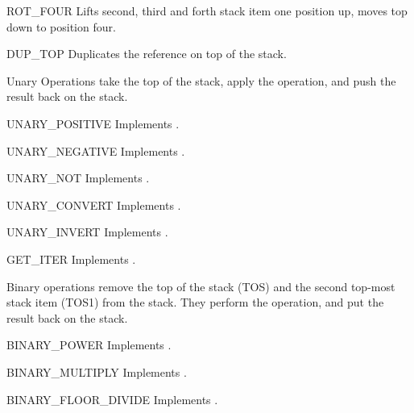 \begin{opcodedesc}{ROT_FOUR}{}
Lifts second, third and forth stack item one position up, moves top down to
position four.
\end{opcodedesc}

\begin{opcodedesc}{DUP_TOP}{}
Duplicates the reference on top of the stack.
\end{opcodedesc}

Unary Operations take the top of the stack, apply the operation, and
push the result back on the stack.

\begin{opcodedesc}{UNARY_POSITIVE}{}
Implements .
\end{opcodedesc}

\begin{opcodedesc}{UNARY_NEGATIVE}{}
Implements .
\end{opcodedesc}

\begin{opcodedesc}{UNARY_NOT}{}
Implements .
\end{opcodedesc}

\begin{opcodedesc}{UNARY_CONVERT}{}
Implements .
\end{opcodedesc}

\begin{opcodedesc}{UNARY_INVERT}{}
Implements .
\end{opcodedesc}

\begin{opcodedesc}{GET_ITER}{}
Implements .
\end{opcodedesc}

Binary operations remove the top of the stack (TOS) and the second top-most
stack item (TOS1) from the stack.  They perform the operation, and put the
result back on the stack.

\begin{opcodedesc}{BINARY_POWER}{}
Implements .
\end{opcodedesc}

\begin{opcodedesc}{BINARY_MULTIPLY}{}
Implements .
\end{opcodedesc}

\begin{opcodedesc}{BINARY_FLOOR_DIVIDE}{}
Implements .
\end{opcodedesc}

